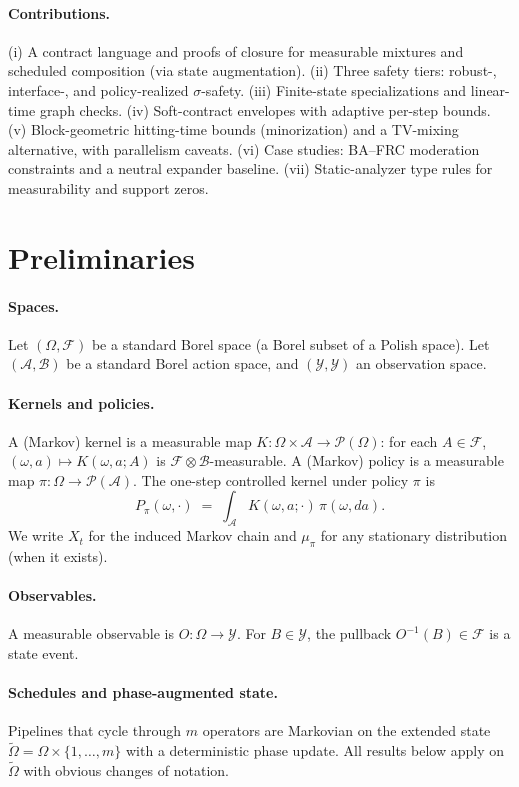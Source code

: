 \documentclass[11pt]{article}
\theoremstyle{plain}
\theoremstyle{definition}
\theoremstyle{remark}
\newcommand{\A}{\mathcal{A}}
\newcommand{\F}{\mathcal{F}}
\newcommand{\Y}{\mathcal{Y}}
\newcommand{\B}{\mathcal{B}}
\newcommand{\Pcal}{\mathcal{P}}
\begin{document}
\paragraph{Contributions.}
(i) A contract language and proofs of closure for measurable mixtures and scheduled composition (via state augmentation). (ii) Three safety tiers: robust-, interface-, and policy-realized $\sigma$-safety. (iii) Finite-state specializations and linear-time graph checks. (iv) Soft-contract envelopes with adaptive per-step bounds. (v) Block-geometric hitting-time bounds (minorization) and a TV-mixing alternative, with parallelism caveats. (vi) Case studies: BA--FRC moderation constraints and a neutral expander baseline. (vii) Static-analyzer type rules for measurability and support zeros.

\section{Preliminaries}

\paragraph{Spaces.}
Let $(\Omega,\F)$ be a standard Borel space (a Borel subset of a Polish space). Let $(\A,\B)$ be a standard Borel action space, and $(\Y,\mathcal{Y})$ an observation space.

\paragraph{Kernels and policies.}
A (Markov) kernel is a measurable map $K:\Omega\times \A \to \Pcal(\Omega)$: for each $A\in\F$, $(\omega,a)\mapsto K(\omega,a;A)$ is $\F\otimes\B$-measurable. A (Markov) policy is a measurable map $\pi:\Omega\to \Pcal(\A)$. The one-step controlled kernel under policy $\pi$ is
\[
P_\pi(\omega,\cdot) \;=\; \int_{\A} K(\omega,a;\cdot)\,\pi(\omega,da).
\]
We write $X_t$ for the induced Markov chain and $\mu_\pi$ for any stationary distribution (when it exists).

\paragraph{Observables.}
A measurable observable is $O:\Omega\to \Y$. For $B\in\mathcal{Y}$, the pullback $O^{-1}(B)\in\F$ is a state event.

\paragraph{Schedules and phase-augmented state.}
Pipelines that cycle through $m$ operators are Markovian on the extended state $\tilde\Omega=\Omega\times\{1,\dots,m\}$ with a deterministic phase update. All results below apply on $\tilde\Omega$ with obvious changes of notation.
\end{document}
